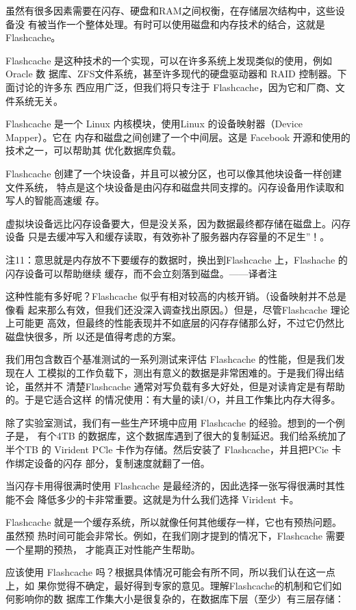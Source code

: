虽然有很多因素需要在闪存、硬盘和RAM之间权衡，在存储层次结构中，这些设备没
有被当作一个整体处理。有时可以使用磁盘和内存技术的结合，这就是 Flashcache。

Flashcache 是这种技术的一个实现，可以在许多系统上发现类似的使用，例如 Oracle 数
据库、ZFS文件系统，甚至许多现代的硬盘驱动器和 RAID 控制器。下面讨论的许多东
西应用广泛，但我们将只专注于 Flashcache，因为它和厂商、文件系统无关。

Flashcache 是一个 Linux 内核模块，使用Linux 的设备映射器（Device Mapper）。它在
内存和磁盘之间创建了一个中间层。这是 Facebook 开源和使用的技术之一，可以帮助其
优化数据库负载。

Flashcache 创建了一个块设备，并且可以被分区，也可以像其他块设备一样创建文件系统，
特点是这个块设备是由闪存和磁盘共同支撑的。闪存设备用作读取和写人的智能高速缓
存。

虚拟块设备远比闪存设备要大，但是没关系，因为数据最终都存储在磁盘上。闪存设备
只是去缓冲写入和缓存读取，有效弥补了服务器内存容量的不足生”！。

注11：意思就是内存放不下要缓存的数据时，换出到Flashcache 上，Flashache 的闪存设备可以帮助继续
缓存，而不会立刻落到磁盘。——译者注

这种性能有多好呢？Flashcache 似乎有相对较高的内核开销。（设备映射并不总是像看
起来那么有效，但我们还没深入调查找出原因。）但是，尽管Flashcache 理论上可能更
高效，但最终的性能表现并不如底层的闪存存储那么好，不过它仍然比磁盘快很多，所
以还是值得考虑的方案。

我们用包含数百个基准测试的一系列测试来评估 Flashcache 的性能，但是我们发现在人
工模拟的工作负载下，测出有意义的数据是非常困难的。于是我们得出结论，虽然并不
清楚Flashcache 通常对写负载有多大好处，但是对读肯定是有帮助的。于是它适合这样
的情况使用：有大量的读I/O，并且工作集比内存大得多。

除了实验室测试，我们有一些生产环境中应用 Flashcache 的经验。想到的一个例子是，
有个4TB 的数据库，这个数据库遇到了很大的复制延迟。我们给系统加了半个TB 的
Virident PCle 卡作为存储。然后安装了 Flashcache，并且把PCie 卡作绑定设备的闪存
部分，复制速度就翻了一倍。

当闪存卡用得很满时使用 Flashcache 是最经济的，因此选择一张写得很满时其性能不会
降低多少的卡非常重要。这就是为什么我们选择 Virident 卡。

Flashcache 就是一个缓存系统，所以就像任何其他缓存一样，它也有预热问题。虽然预
热时间可能会非常长。例如，在我们刚才提到的情况下，Flashcache 需要一个星期的预热，
才能真正对性能产生帮助。

应该使用 Flashcache 吗？根据具体情况可能会有所不同，所以我们认在这一点上，如
果你觉得不确定，最好得到专家的意见。理解Flashcache的机制和它们如何影响你的数
据库工作集大小是很复杂的，在数据库下层（至少）有三层存储：

